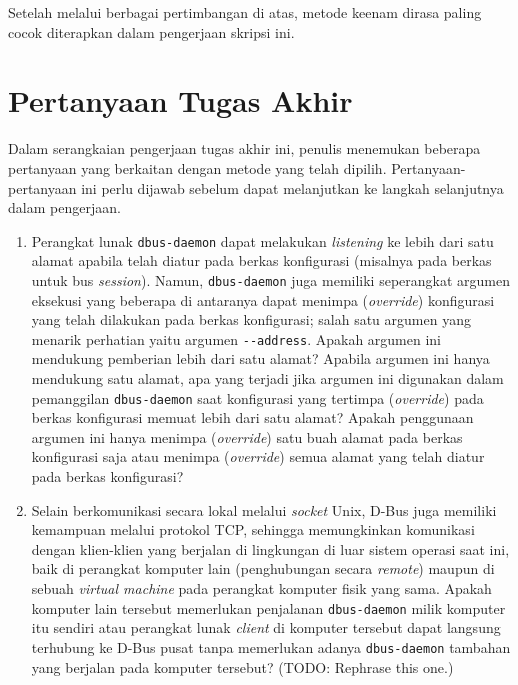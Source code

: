 Setelah melalui berbagai pertimbangan di atas, metode keenam dirasa paling cocok diterapkan dalam pengerjaan skripsi ini.

\section{Pertanyaan Tugas Akhir}

Dalam serangkaian pengerjaan tugas akhir ini, penulis menemukan beberapa pertanyaan yang berkaitan dengan metode yang telah dipilih. Pertanyaan-pertanyaan ini perlu dijawab sebelum dapat melanjutkan ke langkah selanjutnya dalam pengerjaan.

\begin{enumerate}
    \item Perangkat lunak \verb|dbus-daemon| dapat melakukan \textit{listening} ke lebih dari satu alamat apabila telah diatur pada berkas konfigurasi (misalnya pada berkas  untuk bus \textit{session}). Namun, \verb|dbus-daemon| juga memiliki seperangkat argumen eksekusi \cite{dbus-daemon-man-page} yang beberapa di antaranya dapat menimpa (\textit{override}) konfigurasi yang telah dilakukan pada berkas konfigurasi; salah satu argumen yang menarik perhatian yaitu argumen \verb|--address|. Apakah argumen ini mendukung pemberian lebih dari satu alamat? Apabila argumen ini hanya mendukung satu alamat, apa yang terjadi jika argumen ini digunakan dalam pemanggilan \verb|dbus-daemon| saat konfigurasi yang tertimpa (\textit{override}) pada berkas konfigurasi memuat lebih dari satu alamat? Apakah penggunaan argumen ini hanya menimpa (\textit{override}) satu buah alamat pada berkas konfigurasi saja atau menimpa (\textit{override}) semua alamat yang telah diatur pada berkas konfigurasi?

    \item Selain berkomunikasi secara lokal melalui \textit{socket} Unix, D-Bus juga memiliki kemampuan melalui protokol TCP, sehingga memungkinkan komunikasi dengan klien-klien yang berjalan di lingkungan di luar sistem operasi saat ini, baik di perangkat komputer lain (penghubungan secara \textit{remote}) maupun di sebuah \textit{virtual machine} pada perangkat komputer fisik yang sama. Apakah komputer lain tersebut memerlukan penjalanan \verb|dbus-daemon| milik komputer itu sendiri atau perangkat lunak \textit{client} di komputer tersebut dapat langsung terhubung ke D-Bus pusat tanpa memerlukan adanya \verb|dbus-daemon| tambahan yang berjalan pada komputer tersebut? (TODO: Rephrase this one.)
\end{enumerate}
